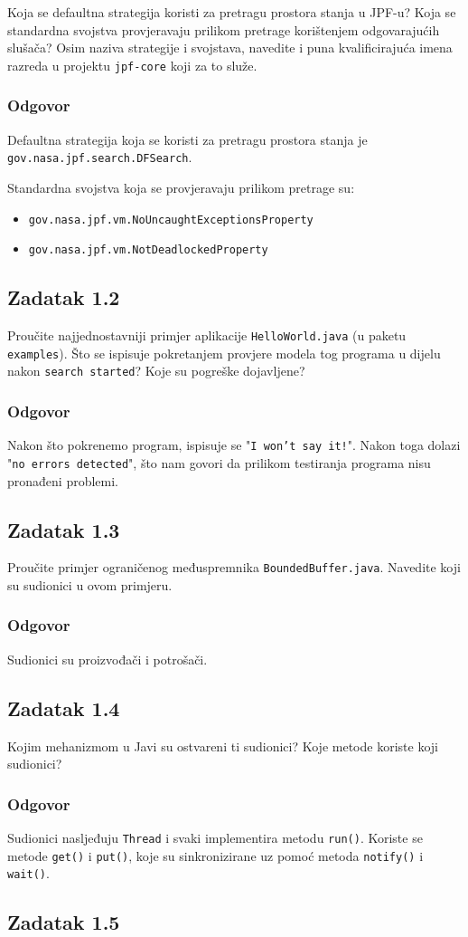 \documentclass{article}
\newcommand{\zadatak}[1]{\subsection{Zadatak #1}}
\newcommand{\odgovor}{\subsubsection*{Odgovor}}
\newcommand{\code}[1]{\colorbox{blue!11}{\texttt{#1}}}
\begin{document}
\noindent
Koja se defaultna strategija koristi za pretragu prostora stanja u JPF-u? Koja se standardna svojstva provjeravaju prilikom pretrage korištenjem odgovarajućih slušača? Osim naziva strategije i svojstava, navedite i puna kvalificirajuća imena razreda u projektu \texttt{jpf-core} koji za to služe.

\odgovor

Defaultna strategija koja se koristi za pretragu prostora stanja je\newline
\texttt{gov.nasa.jpf.search.DFSearch}.\newline

\noindent
Standardna svojstva koja se provjeravaju prilikom pretrage su:

\begin{itemize}
    \item \texttt{gov.nasa.jpf.vm.NoUncaughtExceptionsProperty}
    \item \texttt{gov.nasa.jpf.vm.NotDeadlockedProperty}
\end{itemize}

\zadatak{1.2}

Proučite najjednostavniji primjer aplikacije \texttt{HelloWorld.java} (u paketu \texttt{examples}). Što se ispisuje pokretanjem provjere modela tog programa u dijelu nakon \texttt{search started}? Koje su pogreške dojavljene?

\odgovor

Nakon što pokrenemo program, ispisuje se "\texttt{I won't say it!}". Nakon toga dolazi "\texttt{no errors detected}", što nam govori da prilikom testiranja programa nisu pronađeni problemi.

\pagebreak  %

\zadatak{1.3}

Proučite primjer ograničenog međuspremnika \texttt{BoundedBuffer.java}. Navedite koji su sudionici u ovom primjeru. 

\odgovor

Sudionici su proizvođači i potrošači.

\zadatak{1.4}

Kojim mehanizmom u Javi su ostvareni ti sudionici? Koje metode koriste koji sudionici?

\odgovor

Sudionici nasljeđuju \texttt{Thread} i svaki implementira metodu \code{run()}. Koriste se metode \code{get()} i \code{put()}, koje su sinkronizirane uz pomoć metoda \code{notify()} i \code{wait()}.

\zadatak{1.5}
\end{document}
